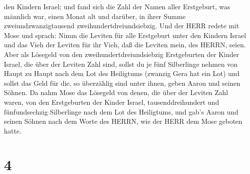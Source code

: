 den Kindern Israel;  und fand sich die Zahl der Namen aller
Erstgeburt, was männlich war, einen Monat alt und darüber, in ihrer
Summe zweiundzwanzigtausend zweihundertdreiundsiebzig.  Und
der HERR redete mit Mose und sprach:  Nimm die Leviten für
alle Erstgeburt unter den Kindern Israel und das Vieh der Leviten für
ihr Vieh, daß die Leviten mein, des HERRN, seien.  Aber als
Lösegeld von den zweihundertdreiundsiebzig Erstgeburten der Kinder
Israel, die über der Leviten Zahl sind,  sollst du je fünf
Silberlinge nehmen von Haupt zu Haupt nach dem Lot des Heiligtums
(zwanzig Gera hat ein Lot)  und sollst das Geld für die, so
überzählig sind unter ihnen, geben Aaron und seinen Söhnen.
 Da nahm Mose das Lösegeld von denen, die über der Leviten
Zahl waren,  von den Erstgeburten der Kinder Israel,
tausenddreihundert und fünfundsechzig Silberlinge nach dem Lot des
Heiligtums,  und gab's Aaron und seinen Söhnen nach dem
Worte des HERRN, wie der HERR dem Mose geboten hatte.

\hypertarget{section-3}{%
\section{4}\label{section-3}}

